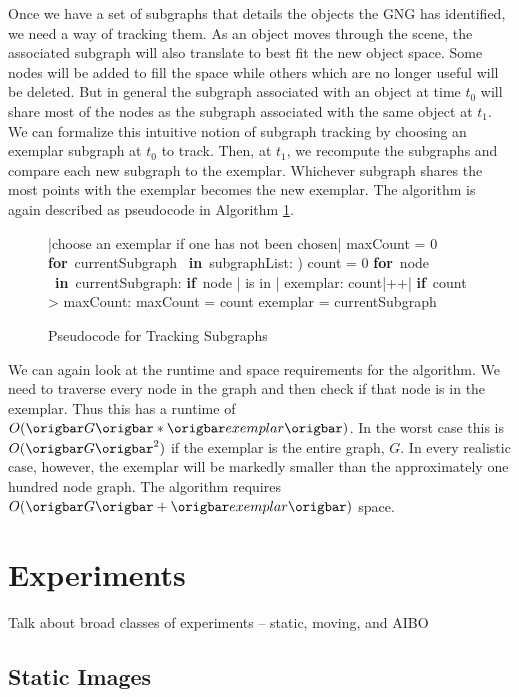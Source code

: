 \documentclass{article}
\renewcommand{\|}{\origbar} %
\renewcommand{\FOR}{\mbox{{\bf for} }\tab}
\renewcommand{\IF}{\mbox{{\bf if} }\tab}
\newcommand{\IN}{\mbox{ {\bf in} }}
\begin{document}
Once we have a set of subgraphs that details the objects the GNG has identified, we need a way of tracking them. As an object moves through the scene, the associated subgraph will also translate to best fit the new object space. Some nodes will be added to fill the space while others which are no longer useful will be deleted. But in general the subgraph associated with an object at time $t_0$ will share most of the nodes as the subgraph associated with the same object at $t_1$. We can formalize this intuitive notion of subgraph tracking by choosing an exemplar subgraph at $t_0$ to track. Then, at $t_1$, we recompute the subgraphs and compare each new subgraph to the exemplar. Whichever subgraph shares the most points with the exemplar becomes the new exemplar. The algorithm is again described as pseudocode in Algorithm \ref{alg:trackingSubgraphs}.

\begin{figure}[h!]
\begin{program}
  |choose an exemplar if one has not been chosen|
  maxCount = 0
  \FOR currentSubgraph \IN subgraphList: )
    count = 0
    \FOR node \IN currentSubgraph:
      \IF node | is in | exemplar:
        count|++| \untab \untab
    \IF count > maxCount:
      maxCount = count
      exemplar = currentSubgraph
\end{program}
\caption{Pseudocode for Tracking Subgraphs}
\label{alg:trackingSubgraphs}
\end{figure}

We can again look at the runtime and space requirements for the algorithm. We need to traverse every node in the graph and then check if that node is in the exemplar. Thus this has a runtime of $O(\|G\|*\|exemplar\|)$. In the worst case this is $O(\|G\|^2)$ if the exemplar is the entire graph, $G$. In every realistic case, however, the exemplar will be markedly smaller than the approximately one hundred node graph. The algorithm requires $O(\|G\|+\|exemplar\|)$ space.

\section{Experiments}

Talk about broad classes of experiments -- static, moving, and AIBO

\subsection{Static Images}
\end{document}
